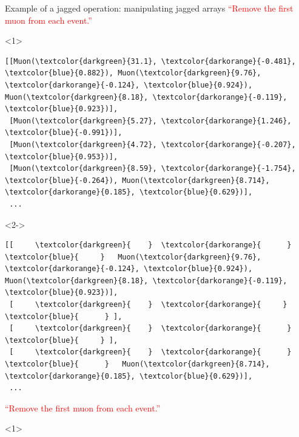 \documentclass[aspectratio=169]{beamer}
\begin{document}
\begin{frame}[fragile]{Example of a jagged operation: manipulating jagged arrays}
\vspace{0.5 cm}
\textcolor{red}{``Remove the first muon from each event.''} 
\scriptsize
\begin{onlyenv}<1>
\begin{Verbatim}[commandchars=\\\{\}]
[[Muon(\textcolor{darkgreen}{31.1}, \textcolor{darkorange}{-0.481}, \textcolor{blue}{0.882}), Muon(\textcolor{darkgreen}{9.76}, \textcolor{darkorange}{-0.124}, \textcolor{blue}{0.924}), Muon(\textcolor{darkgreen}{8.18}, \textcolor{darkorange}{-0.119}, \textcolor{blue}{0.923})],
 [Muon(\textcolor{darkgreen}{5.27}, \textcolor{darkorange}{1.246}, \textcolor{blue}{-0.991})],
 [Muon(\textcolor{darkgreen}{4.72}, \textcolor{darkorange}{-0.207}, \textcolor{blue}{0.953})],
 [Muon(\textcolor{darkgreen}{8.59}, \textcolor{darkorange}{-1.754}, \textcolor{blue}{-0.264}), Muon(\textcolor{darkgreen}{8.714}, \textcolor{darkorange}{0.185}, \textcolor{blue}{0.629})],
 ...
\end{Verbatim}
\end{onlyenv}\begin{onlyenv}<2->
\begin{Verbatim}[commandchars=\\\{\}]
[[     \textcolor{darkgreen}{    }  \textcolor{darkorange}{      }  \textcolor{blue}{     }   Muon(\textcolor{darkgreen}{9.76}, \textcolor{darkorange}{-0.124}, \textcolor{blue}{0.924}), Muon(\textcolor{darkgreen}{8.18}, \textcolor{darkorange}{-0.119}, \textcolor{blue}{0.923})],
 [     \textcolor{darkgreen}{    }  \textcolor{darkorange}{     }  \textcolor{blue}{      } ],
 [     \textcolor{darkgreen}{    }  \textcolor{darkorange}{      }  \textcolor{blue}{     } ],
 [     \textcolor{darkgreen}{    }  \textcolor{darkorange}{      }  \textcolor{blue}{      }   Muon(\textcolor{darkgreen}{8.714}, \textcolor{darkorange}{0.185}, \textcolor{blue}{0.629})],
 ...
\end{Verbatim}
\end{onlyenv}
\normalsize
\vspace{0.5 cm}
\textcolor{red}{``Remove the first muon from each event.''} 
\vspace{0.25 cm}
\begin{onlyenv}<1>
\begin{tabular}{r l}

\end{tabular}
\end{onlyenv}
\end{frame}
\end{document}
